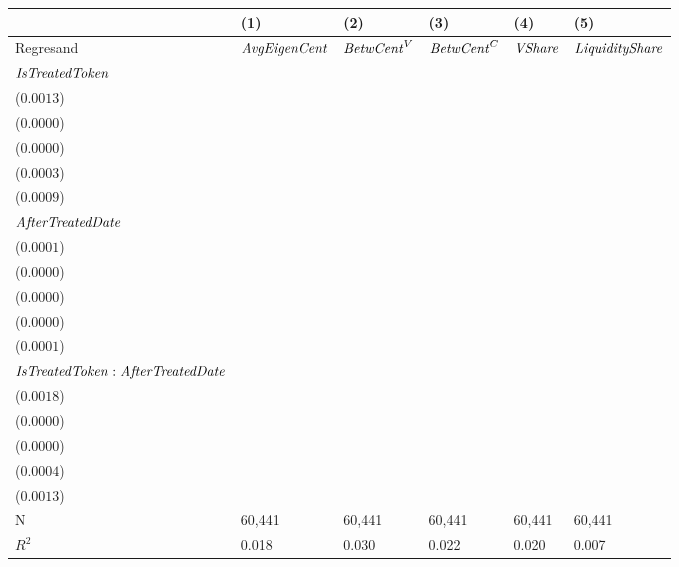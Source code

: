 \begin{tabular}{llllll}
\toprule
{} &                                      (1) &                                      (2) &                                      (3) &                                      (4) &                                      (5) \\
\midrule
Regresand                                     &                     ${\it AvgEigenCent}$ &                       ${\it BetwCent}^V$ &                       ${\it BetwCent}^C$ &                           ${\it VShare}$ &                   ${\it LiquidityShare}$ \\
${\it IsTreatedToken}$                        &  \makecell{$0.0124^{***}$ \\ ($0.0013$)} &  \makecell{$0.0004^{***}$ \\ ($0.0000$)} &  \makecell{$0.0001^{***}$ \\ ($0.0000$)} &  \makecell{$0.0034^{***}$ \\ ($0.0003$)} &  \makecell{$0.0079^{***}$ \\ ($0.0009$)} \\
${\it AfterTreatedDate}$                      &  \makecell{$0.0022^{***}$ \\ ($0.0001$)} &  \makecell{$0.0000^{***}$ \\ ($0.0000$)} &  \makecell{$0.0000^{***}$ \\ ($0.0000$)} &  \makecell{$0.0006^{***}$ \\ ($0.0000$)} &  \makecell{$0.0009^{***}$ \\ ($0.0001$)} \\
${\it IsTreatedToken}:{\it AfterTreatedDate}$ &   \makecell{$0.0036^{**}$ \\ ($0.0018$)} &    \makecell{$-0.0000^{}$ \\ ($0.0000$)} &  \makecell{$0.0000^{***}$ \\ ($0.0000$)} &   \makecell{$0.0009^{**}$ \\ ($0.0004$)} &    \makecell{$-0.0008^{}$ \\ ($0.0013$)} \\
\midrule N                                    &                                   60,441 &                                   60,441 &                                   60,441 &                                   60,441 &                                   60,441 \\
$R^2$                                         &                                    0.018 &                                    0.030 &                                    0.022 &                                    0.020 &                                    0.007 \\
\bottomrule
\end{tabular}
